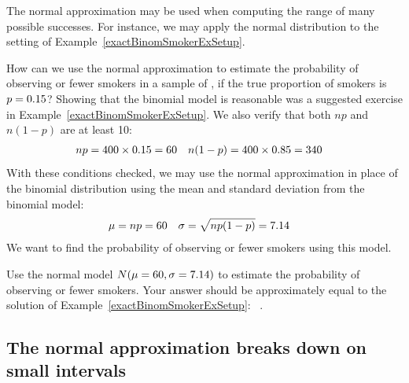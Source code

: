 The normal approximation may be used when computing
the range of many possible successes.
For instance, we may apply the normal distribution to
the setting of Example~\ref{exactBinomSmokerExSetup}.

\D{\newpage}

\begin{examplewrap}
\begin{nexample}{How can we use the normal approximation
    to estimate the probability of observing \smokex{} or
    fewer smokers in a sample of \smoken{}, if the true
    proportion of smokers is $p = 0.15{}$?}
  \label{approxNormalForSmokerBinomEx}
  Showing that the binomial model is reasonable was a
  suggested exercise in Example~\ref{exactBinomSmokerExSetup}.
  We also verify that both $np$ and $n(1-p)$ are at least 10:
  \begin{align*}
  np &= 400{} \times 0.15{} = 60{}
  &n (1 - p) &= 400{} \times 0.85{}
      = 340{}
  \end{align*}
  With these conditions checked, we may use the normal
  approximation in place of the binomial distribution
  using the mean and standard deviation from the binomial
  model:
  \begin{align*}
  \mu &= np = 60{}
  &\sigma &= \sqrt{np(1 - p)} = 7.14{}
  \end{align*}
  We want to find the probability of observing
  \smokex{} or fewer smokers using this model.
\end{nexample}
\end{examplewrap}

\begin{exercisewrap}
\begin{nexercise}
Use the normal model $N(\mu = 60{}, \sigma = 7.14{})$
to estimate the probability of observing \smokex{} or fewer
smokers.
Your answer should be approximately equal to the solution
of Example~\ref{exactBinomSmokerExSetup}:%
~\smokelowertailbinom{}.~\footnotemark{}
\end{nexercise}
\end{exercisewrap}



\newpage


\subsection{The normal approximation breaks down on small intervals}

